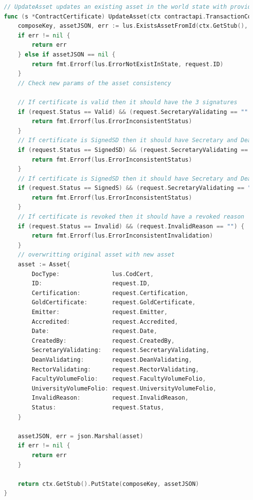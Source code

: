 \begin{lstlisting}[language=Go,caption={Función para modificar un certificado de la blockchain}, label={code:10}]
// UpdateAsset updates an existing asset in the world state with provided parameters.
func (s *ContractCertificate) UpdateAsset(ctx contractapi.TransactionContextInterface, request *Asset) error {
	composeKey, assetJSON, err := lus.ExistsAssetFromId(ctx.GetStub(), lus.CodCert, request.ID)
	if err != nil {
		return err
	} else if assetJSON == nil {
		return fmt.Errorf(lus.ErrorNotExistInState, request.ID)
	}
	// Check new params of the asset consistency
	
	// If certificate is valid then it should have the 3 signatures
	if (request.Status == Valid) && (request.SecretaryValidating == "" || request.DeanValidating == "" || request.RectorValidating == "") {
		return fmt.Errorf(lus.ErrorInconsistentStatus)
	}
	// If certificate is SignedSD then it should have Secretary and Dean signatures
	if (request.Status == SignedSD) && (request.SecretaryValidating == "" || request.DeanValidating == "") {
		return fmt.Errorf(lus.ErrorInconsistentStatus)
	}
	// If certificate is SignedSD then it should have Secretary and Dean signatures
	if (request.Status == SignedS) && (request.SecretaryValidating == "") {
		return fmt.Errorf(lus.ErrorInconsistentStatus)
	}
	// If certificate is revoked then it should have a revoked reason
	if (request.Status == Invalid) && (request.InvalidReason == "") {
		return fmt.Errorf(lus.ErrorInconsistentInvalidation)
	}
	// overwritting original asset with new asset
	asset := Asset{
		DocType:               lus.CodCert,
		ID:                    request.ID,
		Certification:         request.Certification,
		GoldCertificate:       request.GoldCertificate,
		Emitter:               request.Emitter,
		Accredited:            request.Accredited,
		Date:                  request.Date,
		CreatedBy:             request.CreatedBy,
		SecretaryValidating:   request.SecretaryValidating,
		DeanValidating:        request.DeanValidating,
		RectorValidating:      request.RectorValidating,
		FacultyVolumeFolio:    request.FacultyVolumeFolio,
		UniversityVolumeFolio: request.UniversityVolumeFolio,
		InvalidReason:         request.InvalidReason,
		Status:                request.Status,
	}
	
	assetJSON, err = json.Marshal(asset)
	if err != nil {
		return err
	}
	
	return ctx.GetStub().PutState(composeKey, assetJSON)
}
\end{lstlisting}

